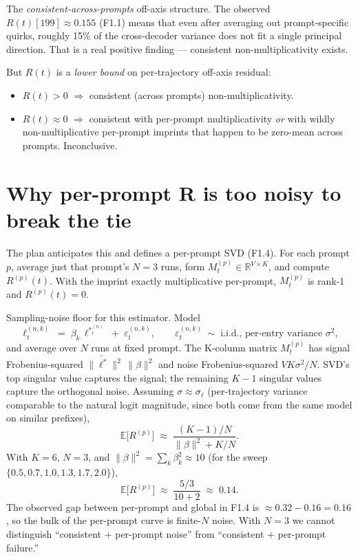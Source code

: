 \documentclass[11pt]{article}
\newcommand{\Rt}{R(t)}
\newcommand{\lstar}{\ell^{*}}
\begin{document}
The \emph{consistent-across-prompts} off-axis structure.
The observed \(\Rt[199]\approx 0.155\) (F1.1) means that even after averaging out prompt-specific quirks,
roughly 15\% of the cross-decoder variance does not fit a single principal direction.
That is a real positive finding --- consistent non-multiplicativity exists.

But \(\Rt\) is a \emph{lower bound} on per-trajectory off-axis residual:
\begin{itemize}[leftmargin=2em]
\item \(\Rt > 0\) \(\Rightarrow\) consistent (across prompts) non-multiplicativity.
\item \(\Rt \approx 0\) \(\Rightarrow\) consistent with per-prompt multiplicativity \emph{or} with wildly non-multiplicative per-prompt imprints that happen to be zero-mean across prompts. Inconclusive.
\end{itemize}

\section{Why per-prompt R is too noisy to break the tie}

The plan anticipates this and defines a per-prompt SVD (F1.4).
For each prompt \(p\), average just that prompt's \(N=3\) runs, form \(M_t^{(p)} \in \mathbb{R}^{V\times K}\), and compute \(R^{(p)}(t)\).
With the imprint exactly multiplicative per-prompt, \(M_t^{(p)}\) is rank-1 and \(R^{(p)}(t) = 0\).

Sampling-noise floor for this estimator.
Model
\[
\ell_t^{(n,k)} \;=\; \beta_k\,\lstar^{(n)}_t \;+\; \varepsilon_t^{(n,k)},
\qquad \varepsilon_t^{(n,k)} \;\sim\; \text{i.i.d., per-entry variance } \sigma^2,
\]
and average over \(N\) runs at fixed prompt.
The K-column matrix \(M_t^{(p)}\) has signal Frobenius-squared \(\|\widetilde{\lstar}\|^2\,\|\beta\|^2\)
and noise Frobenius-squared \(V K \sigma^2 / N\).
SVD's top singular value captures the signal; the remaining \(K-1\) singular values capture the orthogonal noise.
Assuming \(\sigma \approx \sigma_\ell\)
(per-trajectory variance comparable to the natural logit magnitude, since both come from the same model on similar prefixes),
\[
\mathbb{E}\bigl[R^{(p)}\bigr]
\;\approx\;
\frac{(K-1)/N}{\|\beta\|^2 + K/N}.
\]
With \(K=6\), \(N=3\), and \(\|\beta\|^2 = \sum_k \beta_k^2 \approx 10\) (for the sweep \(\{0.5,0.7,1.0,1.3,1.7,2.0\}\)),
\[
\mathbb{E}\bigl[R^{(p)}\bigr]
\;\approx\;
\frac{5/3}{10 + 2}
\;\approx\;
0.14.
\]
The observed gap between per-prompt and global in F1.4 is \(\approx 0.32 - 0.16 = 0.16\),
so the bulk of the per-prompt curve is finite-\(N\) noise.
With \(N=3\) we cannot distinguish ``consistent + per-prompt noise'' from ``consistent + per-prompt failure.''
\end{document}
